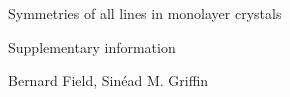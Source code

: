 \documentclass{article}
\begin{document}
	\begin{center}
		{\Large Symmetries of all lines in monolayer crystals}
		
		{\large Supplementary information}
		
		Bernard Field, Sin\'ead M. Griffin
	\end{center}
	
	
	\clearpage
	
	
\end{document}
